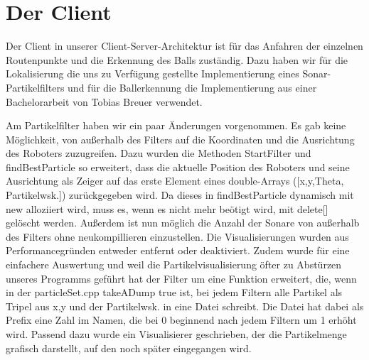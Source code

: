 \chapter{Der Client}
Der Client in unserer Client-Server-Architektur ist für das Anfahren der
einzelnen Routenpunkte und die Erkennung des Balls zuständig. Dazu haben
wir für die Lokalisierung die uns zu Verfügung gestellte Implementierung
eines Sonar-Partikelfilters und für die Ballerkennung die Implementierung
aus einer Bachelorarbeit von Tobias Breuer verwendet.

Am Partikelfilter haben wir ein paar Änderungen vorgenommen. Es gab keine
Möglichkeit, von außerhalb des Filters auf die Koordinaten und die
Ausrichtung des Roboters zuzugreifen. Dazu wurden die Methoden StartFilter
und findBestParticle so erweitert, dass die aktuelle Position des Roboters
und seine Ausrichtung als Zeiger auf das erste Element eines double-Arrays
([x,y,Theta, Partikelwsk.]) zurückgegeben wird. Da dieses in
findBestParticle dynamisch mit new alloziiert wird, muss es, wenn es nicht
mehr beötigt wird, mit delete[] gelöscht werden. Außerdem ist nun möglich
die Anzahl der Sonare von außerhalb des Filters ohne neukompillieren
einzustellen. Die Visualisierungen wurden aus Performancegründen entweder
entfernt oder deaktiviert. Zudem wurde für eine einfachere Auswertung und
weil die Partikelvisualisierung öfter zu Abstürzen unseres Programms
geführt hat der Filter um eine Funktion erweitert, die, wenn in der
particleSet.cpp takeADump true ist, bei jedem Filtern alle Partikel als
Tripel aus x,y und der Partikelwsk. in eine Datei schreibt. Die Datei hat
dabei als Prefix eine Zahl im Namen, die bei 0 beginnend nach jedem Filtern
 um 1 erhöht wird. Passend dazu wurde ein Visualisierer geschrieben, der
die Partikelmenge grafisch darstellt, auf den noch später eingegangen wird.

